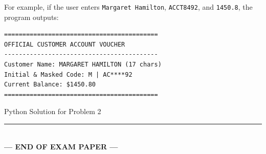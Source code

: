 \documentclass[11pt,a4paper]{article}
\begin{document}
For example, if the user enters \texttt{Margaret Hamilton}, \texttt{ACCT8492}, and \texttt{1450.8}, the program outputs:
\begin{lstlisting}
==========================================
OFFICIAL CUSTOMER ACCOUNT VOUCHER
------------------------------------------
Customer Name: MARGARET HAMILTON (17 chars)
Initial & Masked Code: M | AC****92
Current Balance: $1450.80
==========================================
\end{lstlisting}

\begin{answerbox}[height=12.2cm]{Python Solution for Problem 2}
\end{answerbox}

\vfill
\begin{center}
  \rule{0.5\textwidth}{0.4pt}\\[1mm]
  \textbf{\color{primaryblue}--- END OF EXAM PAPER ---}
\end{center}
\end{document}

